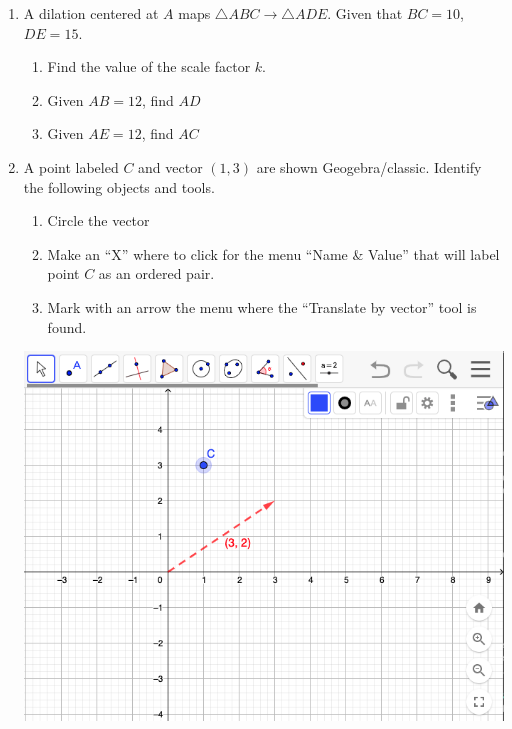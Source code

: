 \documentclass[12pt, twoside]{article}
\begin{document}
\begin{enumerate}
\newpage
\item A dilation centered at $A$ maps $\triangle ABC \rightarrow \triangle ADE$. Given that $BC = 10$, $DE = 15$.
  \begin{enumerate}[itemsep=1.5cm]
    \item Find the value of the scale factor $k$.
    \item Given $AB=12$, find $AD$
    \item Given $AE=12$, find $AC$
  \end{enumerate}
    \begin{flushright}
    \end{flushright}

\newpage
\item A point labeled $C$ and vector $(1,3)$ are shown Geogebra/classic. Identify the following objects and tools.
  \begin{enumerate}
    \item Circle the vector
    \item Make an ``X'' where to click for the menu ``Name \& Value'' that will label point $C$ as an ordered pair.
    \item Mark with an arrow the menu where the ``Translate by vector'' tool is found.
  \end{enumerate}
  \begin{flushright}
    \includegraphics[width=6in]{5-11Geogebra_toolbar.png}
  \end{flushright}


\end{enumerate}
\end{document}
